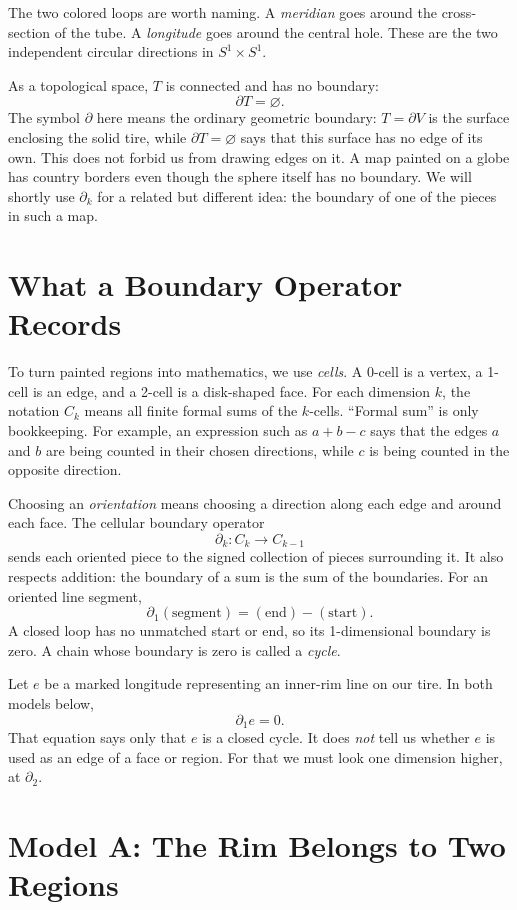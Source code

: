 \documentclass[12pt]{article}
\newcommand{\bd}{\partial}
\begin{document}
The two colored loops are worth naming.  A \emph{meridian} goes around the
cross-section of the tube.  A \emph{longitude} goes around the central hole.
These are the two independent circular directions in \(S^1\times S^1\).

As a topological space, \(T\) is connected and has no boundary:
\[
  \bd T=\varnothing.
\]
The symbol \(\bd\) here means the ordinary geometric boundary: \(T=\bd V\) is
the surface enclosing the solid tire, while \(\bd T=\varnothing\) says that this
surface has no edge of its own.  This does not forbid us from drawing edges on
it.  A map painted on a globe has country borders even though the sphere itself
has no boundary.  We will shortly use \(\bd_k\) for a related but different
idea: the boundary of one of the pieces in such a map.

\section{What a Boundary Operator Records}

To turn painted regions into mathematics, we use \emph{cells}.  A 0-cell is a
vertex, a 1-cell is an edge, and a 2-cell is a disk-shaped face.  For each
dimension \(k\), the notation \(C_k\) means all finite formal sums of the
\(k\)-cells.  ``Formal sum'' is only bookkeeping.  For example, an expression
such as \(a+b-c\) says that the edges \(a\) and \(b\) are being counted in their
chosen directions, while \(c\) is being counted in the opposite direction.

Choosing an \emph{orientation} means choosing a direction along each edge and
around each face.  The cellular boundary operator
\[
  \bd_k:C_k\longrightarrow C_{k-1}
\]
sends each oriented piece to the signed collection of pieces surrounding it.
It also respects addition: the boundary of a sum is the sum of the boundaries.
For an oriented line segment,
\[
  \bd_1(\text{segment})=(\text{end})-(\text{start}).
\]
A closed loop has no unmatched start or end, so its 1-dimensional boundary is
zero.  A chain whose boundary is zero is called a \emph{cycle}.

Let \(e\) be a marked longitude representing an inner-rim line on our tire.  In
both models below,
\[
  \bd_1e=0.
\]
That equation says only that \(e\) is a closed cycle.  It does \emph{not} tell us
whether \(e\) is used as an edge of a face or region.  For that we must look one
dimension higher, at \(\bd_2\).

\section{Model A: The Rim Belongs to Two Regions}
\end{document}
